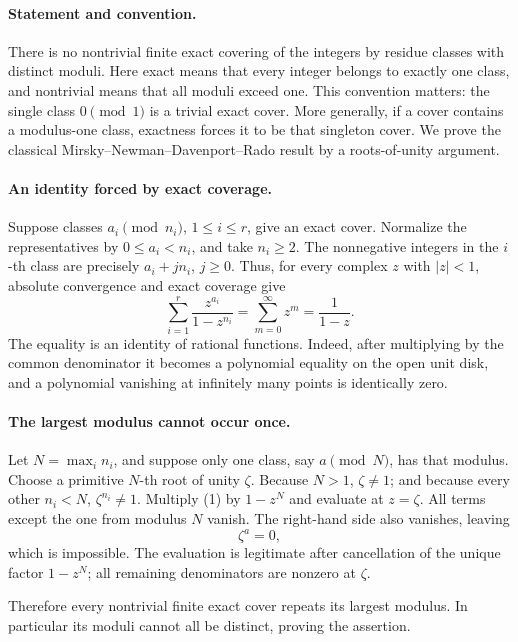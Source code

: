 \paragraph{Statement and convention.}
There is no nontrivial finite exact covering of the integers by residue classes with distinct moduli. Here exact means that every integer belongs to exactly one class, and nontrivial means that all moduli exceed one. This convention matters: the single class \(0\pmod1\) is a trivial exact cover. More generally, if a cover contains a modulus-one class, exactness forces it to be that singleton cover. We prove the classical Mirsky--Newman--Davenport--Rado result by a roots-of-unity argument.

\paragraph{An identity forced by exact coverage.}
Suppose classes \(a_i\pmod{n_i}\), \(1\leq i\leq r\), give an exact cover. Normalize the representatives by \(0\leq a_i<n_i\), and take \(n_i\geq2\). The nonnegative integers in the \(i\)-th class are precisely \(a_i+j n_i\), \(j\geq0\). Thus, for every complex \(z\) with \(|z|<1\), absolute convergence and exact coverage give
\[
 \sum_{i=1}^r\frac{z^{a_i}}{1-z^{n_i}}
 =\sum_{m=0}^{\infty}z^m=\frac1{1-z}. \tag{1}
\]
The equality is an identity of rational functions. Indeed, after multiplying by the common denominator it becomes a polynomial equality on the open unit disk, and a polynomial vanishing at infinitely many points is identically zero.

\paragraph{The largest modulus cannot occur once.}
Let \(N=\max_i n_i\), and suppose only one class, say \(a\pmod N\), has that modulus. Choose a primitive \(N\)-th root of unity \(\zeta\). Because \(N>1\), \(\zeta\ne1\); and because every other \(n_i<N\), \(\zeta^{n_i}\ne1\). Multiply (1) by \(1-z^N\) and evaluate at \(z=\zeta\). All terms except the one from modulus \(N\) vanish. The right-hand side also vanishes, leaving
\[
 \zeta^a=0,
\]
which is impossible. The evaluation is legitimate after cancellation of the unique factor \(1-z^N\); all remaining denominators are nonzero at \(\zeta\).

Therefore every nontrivial finite exact cover repeats its largest modulus. In particular its moduli cannot all be distinct, proving the assertion.

